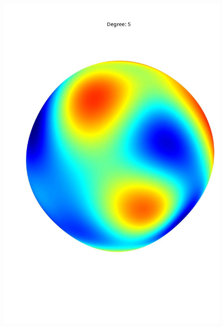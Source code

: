 \documentclass[a4paper]{article}
\theoremstyle{definition}
\begin{document}
\begin{figure}[h!]
\begin{minipage}{.245\textwidth}
        \includegraphics[width=0.95\linewidth]{media/med_5.jpg}
        \label{fig:med5}
    \end{minipage}
    \begin{minipage}{.245\textwidth}
        \centering

\end{minipage}
\end{figure}
\end{document}
